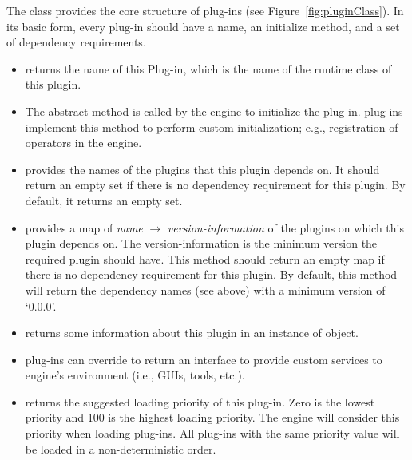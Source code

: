 \documentclass{article}
\begin{document}
The  class provides the core structure of \CoreASM plug-ins (see Figure~\ref{fig:pluginClass}). 
In its basic form, every \CoreASM plug-in should have a name, an initialize method, and a set of dependency requirements. 
\begin{itemize}
	\item {} returns the name of this Plug-in, which is the name of the runtime class of this plugin.

    \item The abstract method  is called by the engine to initialize the plug-in. 
	\CoreASM plug-ins implement this method to perform custom initialization; e.g., registration 
    of operators in the engine.

	\item {} provides the names of the plugins that this plugin depends on. 
	It should return an empty set if there is no dependency requirement for this plugin. By default, 
	it returns an empty set.

	\item {} provides a map of {\em name} $\rightarrow$ {\em version-information} of the plugins 
	on which this plugin depends on. The version-information is the minimum version the required plugin should have. 
	This method should return an empty map if there is no dependency requirement for this plugin. By default, this method 
	will return the dependency names (see above) with a minimum version of `0.0.0'. 

	\item {} returns some information about this plugin in an instance of  object.


	\item \CoreASM plug-ins can override  to return an interface to provide custom services to engine's 
	environment (i.e., GUIs, tools, etc.). 

	\item {} returns the suggested loading priority of this plug-in. Zero is the lowest priority and 100 
	is the highest loading priority. The engine will consider this priority when loading plug-ins. All plug-ins with the same 
	priority value will be loaded in a non-deterministic order.  
 
\end{itemize}
\end{document}
